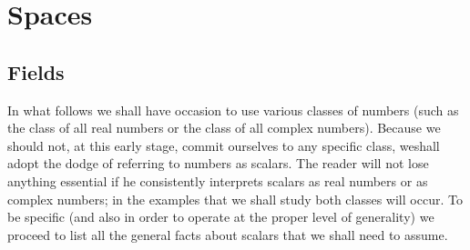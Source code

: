 \chapter{Spaces}

\section{Fields}\label{sec-fields}

In what follows we shall have occasion to use various classes of numbers (such
as the class of all real numbers or the class of all complex numbers). Because
we should not, at this early stage, commit ourselves to any specific class,
weshall adopt the dodge of referring to numbers as scalars. The reader will not
lose anything essential if he consistently interprets scalars as real numbers or
as complex numbers; in the examples that we shall study both classes will occur.
To be specific (and also in order to operate at the proper level of generality)
we proceed to list all the general facts about scalars that we shall need to
assume.
